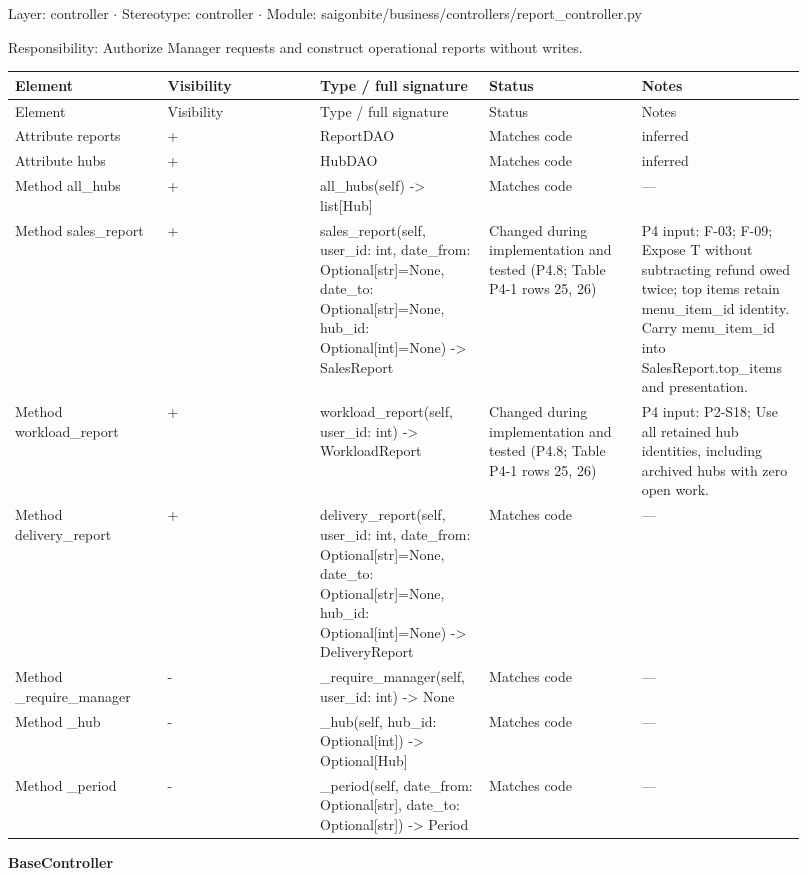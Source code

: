 Layer: controller \ensuremath{\cdot} Stereotype: \guillemotleft{}controller\guillemotright{} \ensuremath{\cdot} Module: saigonbite/business/controllers/report\_controller.py

Responsibility: Authorize Manager requests and construct operational reports without writes.

\begin{longtable}{>{\raggedright\arraybackslash}p{0.1840\linewidth}>{\raggedright\arraybackslash}p{0.1840\linewidth}>{\raggedright\arraybackslash}p{0.1840\linewidth}>{\raggedright\arraybackslash}p{0.1840\linewidth}>{\raggedright\arraybackslash}p{0.1840\linewidth}}
Element & Visibility & Type / full signature & Status & Notes \\
\hline\endfirsthead
Element & Visibility & Type / full signature & Status & Notes \\
\hline\endhead
Attribute reports & + & ReportDAO & Matches code & inferred \\
Attribute hubs & + & HubDAO & Matches code & inferred \\
Method all\_hubs & + & all\_hubs(self) -\textgreater{} list[Hub] & Matches code & --- \\
Method sales\_report & + & sales\_report(self, user\_id: int, date\_from: Optional[str]=None, date\_to: Optional[str]=None, hub\_id: Optional[int]=None) -\textgreater{} SalesReport & Changed during implementation and tested (P4.8; Table P4-1 rows 25, 26) & P4 input: F-03; F-09; Expose T without subtracting refund owed twice; top items retain menu\_item\_id identity. Carry menu\_item\_id into SalesReport.top\_items and presentation. \\
Method workload\_report & + & workload\_report(self, user\_id: int) -\textgreater{} WorkloadReport & Changed during implementation and tested (P4.8; Table P4-1 rows 25, 26) & P4 input: P2-S18; Use all retained hub identities, including archived hubs with zero open work. \\
Method delivery\_report & + & delivery\_report(self, user\_id: int, date\_from: Optional[str]=None, date\_to: Optional[str]=None, hub\_id: Optional[int]=None) -\textgreater{} DeliveryReport & Matches code & --- \\
Method \_require\_manager & - & \_require\_manager(self, user\_id: int) -\textgreater{} None & Matches code & --- \\
Method \_hub & - & \_hub(self, hub\_id: Optional[int]) -\textgreater{} Optional[Hub] & Matches code & --- \\
Method \_period & - & \_period(self, date\_from: Optional[str], date\_to: Optional[str]) -\textgreater{} Period & Matches code & --- \\
\end{longtable}
\textbf{BaseController}

